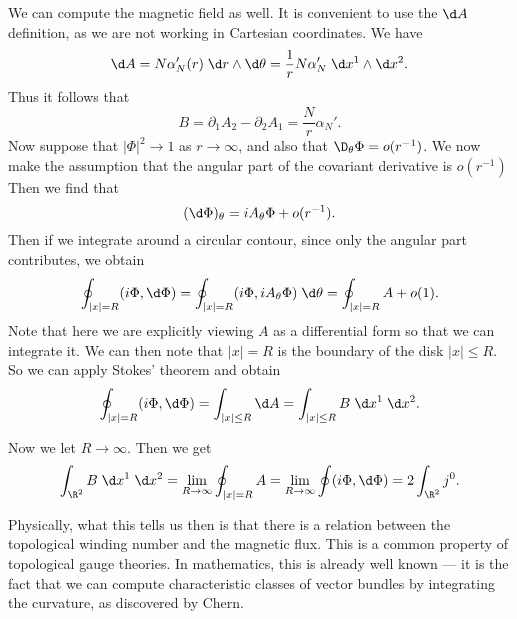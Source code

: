 \documentclass[a4paper]{article}
\begin{document}
We can compute the magnetic field as well. It is convenient to use the $\d A$ definition, as we are not working in Cartesian coordinates. We have
\[
  \d A = N \alpha_N'(r) \;\d r \wedge \d \theta = \frac{1}{r} N \alpha_N'\;\d x^1 \wedge \d x^2.
\]
Thus it follows that
\[
  B = \partial_1 A_2 - \partial_2 A_1 = \frac{N}{r} \alpha_N'.
\]
Now suppose that $|\Phi|^2 \to 1$ as $r \to \infty$, and also that $\D_\theta \Phi = o(r^{-1})$.
We now make the assumption that the angular part of the covariant derivative is $o(r^{-1})$ Then we find that
\[
  (\d \Phi)_\theta = i A_\theta \Phi + o(r^{-1}).
\]
Then if we integrate around a circular contour, since only the angular part contributes, we obtain
\[
  \oint_{|x| = R} (i \Phi, \d \Phi) = \oint_{|x| = R} (i \Phi, i A_\theta \Phi)\;\d \theta = \oint_{|x| = R} A + o(1).
\]
Note that here we are explicitly viewing $A$ as a differential form so that we can integrate it. We can then note that $|x| = R$ is the boundary of the disk $|x| \leq R$. So we can apply Stokes' theorem and obtain
\[
  \oint_{|x| = R} (i \Phi, \d \Phi) = \int_{|x| \leq R} \d A = \int_{|x| \leq R} B\;\d x^1 \;\d x^2.
\]

%
Now we let $R \to \infty$. Then we get
\[
  \int_{\R^2} B\;\d x^1 \;\d x^2 = \lim_{R \to \infty} \oint_{|x| = R} A = \lim_{R \to \infty} \oint (i \Phi, \d \Phi) = 2 \int_{\R^2} j^0.
\]

Physically, what this tells us then is that there is a relation between the topological winding number and the magnetic flux. This is a common property of topological gauge theories. In mathematics, this is already well known --- it is the fact that we can compute characteristic classes of vector bundles by integrating the curvature, as discovered by Chern.
\end{document}
